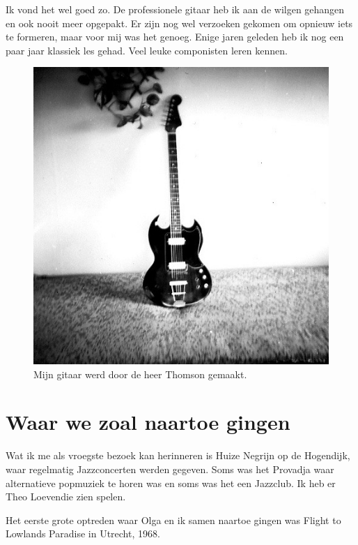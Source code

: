 \documentclass[12pt,twoside, openright]{memoir}
\begin{document}
Ik vond het wel goed zo. De professionele gitaar heb ik aan de wilgen gehangen en ook nooit meer opgepakt. Er zijn nog wel verzoeken gekomen om opnieuw iets te formeren, maar voor mij was het genoeg. Enige jaren geleden heb ik nog een paar jaar klassiek les gehad. Veel leuke componisten leren kennen.

\begin{figure}
\includegraphics[width=\textwidth]{img/ch30/Devotions}
\caption*{\footnotesize Mijn gitaar werd door de heer Thomson gemaakt.}
\end{figure} 

\chapter{Waar we zoal naartoe gingen} %
\label{cha:naartoegaan}

Wat ik me als vroegste bezoek kan herinneren is Huize Negrijn op de Hogendijk, waar regelmatig Jazzconcerten werden gegeven. Soms was het Provadja waar alternatieve popmuziek te horen was en soms was het een Jazzclub. Ik heb er Theo Loevendie zien spelen.

Het eerste grote optreden waar Olga en ik samen naartoe gingen was Flight to Lowlands Paradise in Utrecht, 1968.
\end{document}
